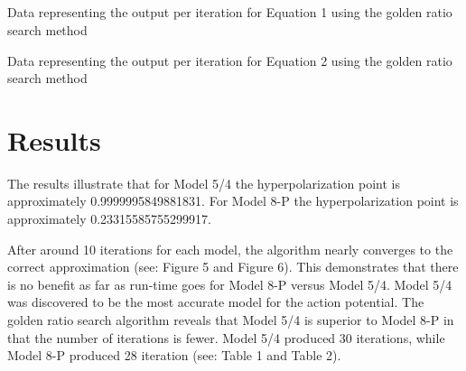 \documentclass[linenumbers,RNAAS,trackchanges]{aastex631}
\begin{document}
\subsection{}
\begin{table}[]
\centering
{}
\caption{Data representing the output per iteration for Equation 1 using the golden ratio search method}
\end{table}
\begin{table}
\centering
{}
\caption{Data representing the output per iteration for Equation 2 using the golden ratio search method}
\end{table}
\newpage


\section{Results} \label{sec:results}
The results illustrate that for Model 5/4 the hyperpolarization point is approximately 0.9999995849881831. For Model 8-P the hyperpolarization point is approximately 0.23315585755299917. 

After around 10 iterations for each model, the algorithm nearly converges to the correct approximation (see: Figure 5 and Figure 6). This demonstrates that there is no benefit as far as run-time goes for Model 8-P versus Model 5/4.  Model 5/4 was discovered to be the most accurate model for the action potential. The golden ratio search algorithm reveals that Model 5/4 is superior to Model 8-P in that the number of iterations is fewer. Model 5/4 produced 30 iterations, while Model 8-P produced 28 iteration (see: Table 1 and Table 2).
\end{document}
